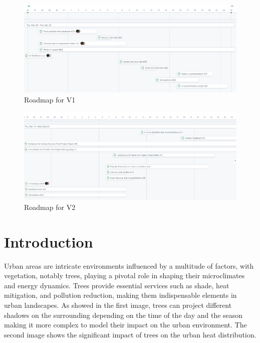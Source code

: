 \documentclass[12pt]{article}
\begin{document}
\begin{figure}[H]
    \centering
    \includegraphics[width=1\textwidth]{images/roadmap_v1.png}
    \caption{Roadmap for V1}
\end{figure}

\begin{figure}[H]
    \centering
    \includegraphics[width=1\textwidth]{images/roadmap_v2.png}
    \caption{Roadmap for V2}
\end{figure}

\newpage

\section{Introduction}
Urban areas are intricate environments influenced by a multitude of factors, with 
vegetation, notably trees, playing a pivotal role in shaping their microclimates 
and energy dynamics. Trees provide essential services such as shade, heat 
mitigation, and pollution reduction, making them indispensable elements in urban 
landscapes\cite{TIR4sTREEt,img:TreeShade}. As showed in the first image, trees can project different shadows
on the surrounding depending on the time of the day and the season making it 
more complex to model their impact on the urban environment. The second image
shows the significant impact of trees on the urban heat distribution.
\end{document}
